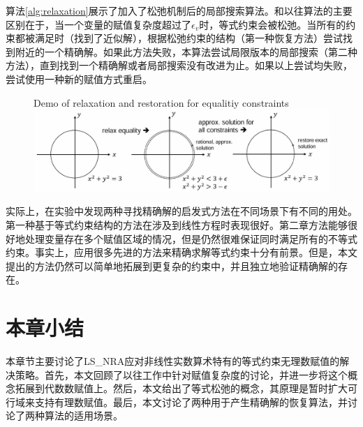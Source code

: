 算法\ref{alg:relaxation}展示了加入了松弛机制后的局部搜索算法。和以往算法的主要区别在于，当一个变量的赋值复杂度超过了$\epsilon_v$时，等式约束会被松弛。当所有的约束都被满足时（找到了近似解），根据松弛约束的结构（第一种恢复方法）尝试找到附近的一个精确解。如果此方法失败，本算法尝试局限版本的局部搜索（第二种方法），直到找到一个精确解或者局部搜索没有改进为止。如果以上尝试均失败，尝试使用一种新的赋值方式重启。

\begin{figure}[t]
    \centering
     {Demo of relaxation and restoration for equalitiy constraints}
    \includegraphics[width=\columnwidth]{Img/relax.jpg}
\label{fig:relaxation}
\end{figure}

实际上，在实验中发现两种寻找精确解的启发式方法在不同场景下有不同的用处。第一种基于等式约束结构的方法在涉及到线性方程时表现很好。第二章方法能够很好地处理变量存在多个赋值区域的情况，但是仍然很难保证同时满足所有的不等式约束。事实上，应用很多先进的方法来精确求解等式约束十分有前景\cite{CimattiGLS22, LiXZ23b}。但是，本文提出的方法仍然可以简单地拓展到更复杂的约束中，并且独立地验证精确解的存在。

\section{本章小结}
本章节主要讨论了LS\_NRA应对非线性实数算术特有的等式约束无理数赋值的解决策略。首先，本文回顾了以往工作中针对赋值复杂度的讨论，并进一步将这个概念拓展到代数数赋值上。然后，本文给出了等式松弛的概念，其原理是暂时扩大可行域来支持有理数赋值。最后，本文讨论了两种用于产生精确解的恢复算法，并讨论了两种算法的适用场景。

